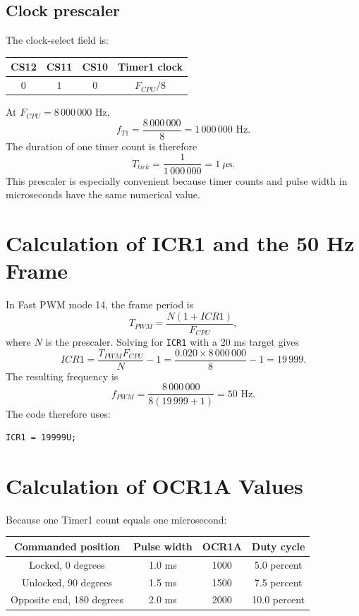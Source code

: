 \documentclass[11pt,a4paper]{article}
\begin{document}
\subsection{Clock prescaler}
The clock-select field is:
\begin{center}
\begin{tabular}{cccc}
\toprule
CS12 & CS11 & CS10 & Timer1 clock \\
\midrule
0 & 1 & 0 & $F_{CPU}/8$ \\
\bottomrule
\end{tabular}
\end{center}
At \(F_{CPU}=8\,000\,000\) Hz,
\[
f_{T1}=\frac{8\,000\,000}{8}=1\,000\,000\text{ Hz}.
\]
The duration of one timer count is therefore
\[
T_{tick}=\frac{1}{1\,000\,000}=1\ \mu\text{s}.
\]
This prescaler is especially convenient because timer counts and pulse width in microseconds have the same numerical value.

\section{Calculation of ICR1 and the 50 Hz Frame}
In Fast PWM mode 14, the frame period is
\[
T_{PWM}=\frac{N(1+ICR1)}{F_{CPU}},
\]
where \(N\) is the prescaler. Solving for \texttt{ICR1} with a 20 ms target gives
\[
ICR1=\frac{T_{PWM}F_{CPU}}{N}-1
     =\frac{0.020\times8\,000\,000}{8}-1
     =19\,999.
\]
The resulting frequency is
\[
f_{PWM}=\frac{8\,000\,000}{8(19\,999+1)}=50\text{ Hz}.
\]
The code therefore uses:
\begin{lstlisting}[style=cstyle]
ICR1 = 19999U;
\end{lstlisting}

\section{Calculation of OCR1A Values}
Because one Timer1 count equals one microsecond:
\begin{center}
\begin{tabular}{cccc}
\toprule
Commanded position & Pulse width & OCR1A & Duty cycle \\
\midrule
Locked, 0 degrees & 1.0 ms & 1000 & 5.0 percent \\
Unlocked, 90 degrees & 1.5 ms & 1500 & 7.5 percent \\
Opposite end, 180 degrees & 2.0 ms & 2000 & 10.0 percent \\
\bottomrule
\end{tabular}
\end{center}
\end{document}
